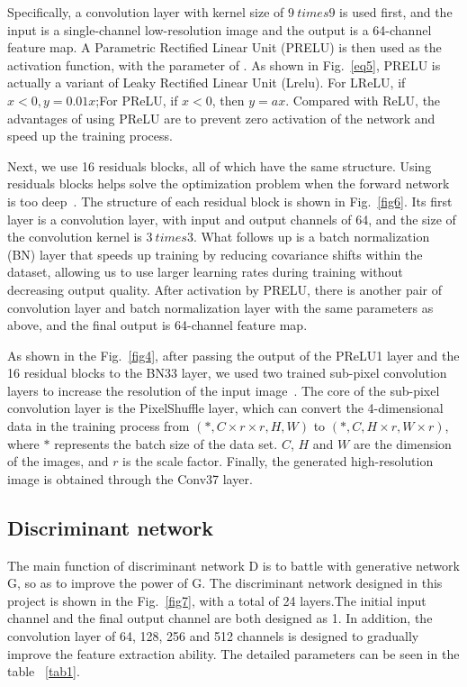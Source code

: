 \documentclass[10pt,twocolumn,letterpaper]{article}
\begin{document}
Specifically, a convolution layer with kernel size of $9 \ times 9$ is used first, and the input is a single-channel low-resolution image and the output is a 64-channel feature map. A Parametric Rectified Linear Unit (PRELU) is then used as the activation function, with the parameter of . As shown in Fig.~\ref{eq5}, PRELU is actually a variant of Leaky Rectified Linear Unit (Lrelu). For LReLU, if $x<0, y=0.01x$;For PReLU, if $x<0$, then $y=ax$. Compared with ReLU, the advantages of using PReLU are to prevent zero activation of the network and speed up the training process.

Next, we use 16 residuals blocks, all of which have the same structure. Using residuals blocks helps solve the optimization problem when the forward network is too deep~\cite{gross2016training}. The structure of each residual block is shown in Fig.~\ref{fig6}. Its first layer is a convolution layer, with input and output channels of 64, and the size of the convolution kernel is $3 \ times 3$. What follows up is a batch normalization (BN) layer that speeds up training by reducing covariance shifts within the dataset, allowing us to use larger learning rates during training without decreasing output quality\cite{ioffe2015batch}. After activation by PRELU, there is another pair of convolution layer and batch normalization layer with the same parameters as above, and the final output is 64-channel feature map.

As shown in the Fig.~\ref{fig4}, after passing the output of the PReLU1 layer and the 16 residual blocks to the BN33 layer, we used two trained sub-pixel convolution layers to increase the resolution of the input image~\cite{shi2016real}. The core of the sub-pixel convolution layer is the PixelShuffle layer, which can convert the 4-dimensional data in the training process from $(*,C\times r\times r,H,W)$ to $(*,C,H\times r,W\times r)$, where $*$ represents the batch size of the data set. $C$, $H$ and $W$ are the dimension of the images, and $r$ is the scale factor. Finally, the generated high-resolution image is obtained through the Conv37 layer.

\subsection{Discriminant network}
The main function of discriminant network D is to battle with generative network G, so as to improve the power of G. The discriminant network designed in this project is shown in the Fig.~\ref{fig7}, with a total of 24 layers.The initial input channel and the final output channel are both designed as 1. In addition, the convolution layer of 64, 128, 256 and 512 channels is designed to gradually improve the feature extraction ability. The detailed parameters can be seen in the table ~\ref{tab1}.
\end{document}
